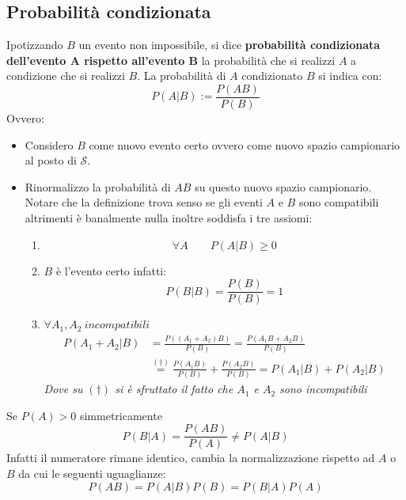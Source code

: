 \documentclass[11pt,a4paper]{book}
\begin{document}
\subsection{Probabilità condizionata} 
Ipotizzando $ B $ un evento non impossibile, si dice \textbf{probabilità condizionata dell'evento A rispetto all'evento B} la probabilità che si realizzi $ A $ a condizione che si realizzi $ B $. La probabilità di $ A $ condizionato $ B $ si indica con:
\begin{equation}
P(A |B) := \frac{P(AB)}{P(B)}
\end{equation}
Ovvero:
\begin{itemize}
\item Considero $ B $ come nuovo evento certo ovvero come nuovo spazio campionario al posto di $ \mathcal{S} $.
\item Rinormalizzo la probabilità di $ AB $ su questo nuovo spazio campionario.
Notare che la definizione trova senso se gli eventi $ A $ e $ B $ sono compatibili altrimenti è banalmente nulla inoltre soddisfa i tre assiomi:
\begin{enumerate}
\item 
\begin{equation}
\forall A \qquad P(A|B) \geq 0
\end{equation}
\item $ B $ è l'evento certo infatti:
\begin{equation}
P(B|B)=\frac{P(B)}{P(B)} = 1
\end{equation}
\item $ \forall A_1, A_2 \ \textit{incompatibili} $
\begin{align}
P(A_1+A_2|B) &= \frac{P((A_1+A_2)B)}{P(B)} = \frac{P(A_1B+A_2B)}{P(B)} \\
& \stackrel{(\dag)}{=} \frac{P(A_1B)}{P(B)}+\frac{P(A_2B)}{P(B)} = P(A_1|B)+ P(A_2|B)
\end{align}
\textit{Dove su $ (\dag) $ si è sfruttato il fatto che $ A_1 $ e $ A_2 $ sono incompatibili}
\end{enumerate}
\end{itemize}
Se $ P(A)>0 $ simmetricamente
\begin{equation}
P(B|A) = \frac{P(AB)}{P(A)} \neq P(A|B)
\end{equation}
Infatti il numeratore rimane identico, cambia la normalizzazione rispetto ad $ A $ o $ B $ da cui le seguenti uguaglianze:
\begin{equation}
P(AB) = P(A|B)P(B) = P(B|A) P(A)
\end{equation}
\end{document}
